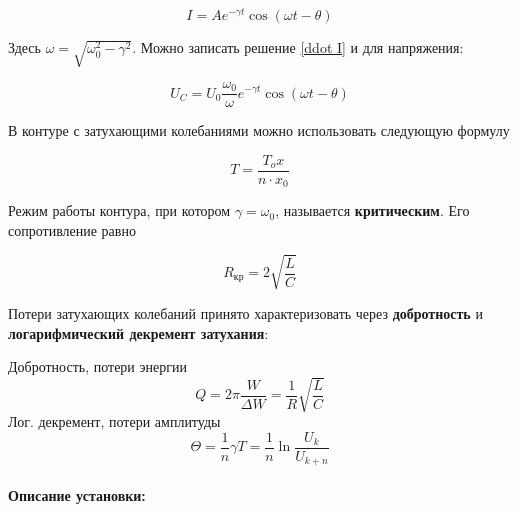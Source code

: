 \documentclass[a4paper,12pt]{article}
\begin{document}
\begin{equation}\label{}
I = A e^{-\gamma t} \cos (\omega t - \theta)
\end{equation}

Здесь $ \omega = \sqrt{\omega_0^2 - \gamma^2} $. Можно записать решение \eqref{ddot I} и для напряжения:

\begin{equation}\label{}
U_C = U_0 \dfrac{\omega_0}{\omega} e^{-\gamma t}\cos (\omega t - \theta)
\end{equation}

В контуре с затухающими колебаниями можно использовать следующую формулу

\begin{equation}\label{}
T = \frac{T_ox}{n\cdot x_0}
\end{equation}

Режим работы контура, при котором $ \gamma = \omega_0 $, называется \textbf{критическим}. Его сопротивление равно 

\begin{equation}\label{}
R_{кр} = 2\sqrt{\dfrac{L}{C}}
\end{equation}

Потери затухающих колебаний принято характеризовать через \textbf{добротность} и \textbf{логарифмический декремент затухания}: 

Добротность, потери энергии
\begin{equation}\label{Q}
Q = 2\pi \dfrac{W}{\Delta W} = \dfrac{1}{R} \sqrt{\dfrac{L}{C}}
\end{equation}
Лог. декремент, потери амплитуды
\begin{equation}\label{theta}
\Theta = \dfrac{1}{n} \gamma T = \dfrac{1}{n} \ln \dfrac{U_k}{U_{k+n}} 
\end{equation}
\paragraph{}

\paragraph{Описание установки:}
\end{document}
